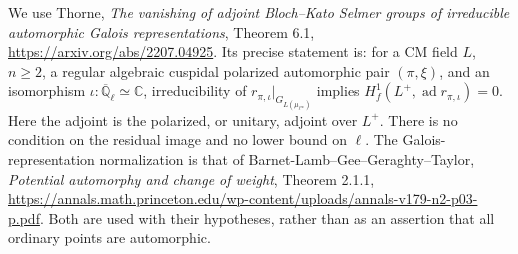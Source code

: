 We use Thorne, \emph{The vanishing of adjoint Bloch--Kato Selmer groups
of irreducible automorphic Galois representations}, Theorem 6.1,
\url{https://arxiv.org/abs/2207.04925}.  Its precise statement is:
for a CM field $L$, $n\ge2$, a regular algebraic cuspidal polarized
automorphic pair $(\pi,\xi)$, and an isomorphism
$\iota:\overline{\mathbb Q}_\ell\simeq\mathbb C$, irreducibility of
$r_{\pi,\iota}|_{G_{L(\mu_{\ell^\infty})}}$ implies
$H^1_f(L^+,\operatorname{ad}r_{\pi,\iota})=0$.
Here the adjoint is the polarized, or unitary, adjoint over $L^+$.
There is no condition on the residual image and no lower bound on
$\ell$.  The Galois-representation normalization is that of
Barnet-Lamb--Gee--Geraghty--Taylor, \emph{Potential automorphy and
change of weight}, Theorem 2.1.1,
\url{https://annals.math.princeton.edu/wp-content/uploads/annals-v179-n2-p03-p.pdf}.
Both are used with their hypotheses, rather than as an assertion that
all ordinary points are automorphic.

